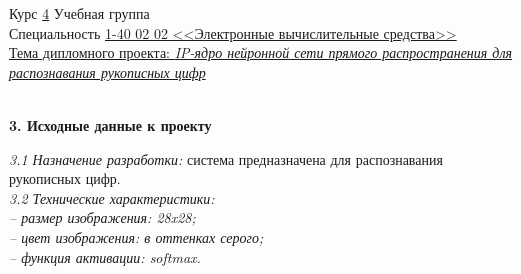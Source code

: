 \noindent
Курс \hspace{1cm}  \underline{\hspace{1cm} 4\hspace{1cm}}\hspace{0.5cm} Учебная группа \hspace{0.5cm}\underline{\hspace{3.5cm} \gr \hspace{3.5cm}} \\
Специальность \hspace{2cm}  \underline{\hspace{1cm} 1-40 02 02 <<Электронные вычислительные средства>>\hspace{1.3cm}}\\
\underline{{Тема дипломного проекта:} \textit{IP-ядро нейронной сети прямого распространения для}\hspace{2cm}}\\
\underline{\textit{распознавания рукописных цифр}\hspace{9.0cm}}\\[0.5em]
\underline{\hspace{16.7cm}}\\[0.5em]

\vspace{1em}

\noindent
{}

\vspace{1em}

\noindent
{\textbf{3. Исходные данные к проекту}}

\noindent
{\textit{3.1 Назначение разработки:} система предназначена для распознавания рукописных цифр.}\\[0.2em]
{\textit{3.2 Технические характеристики:}}\\[-0.3em]
{\textit{– размер изображения: 28x28;}}\\[-0.3em]
{\textit{– цвет изображения: в оттенках серого;}}\\[-0.3em]
{\textit{– функция активации: softmax.}}\\[-0.3em]

